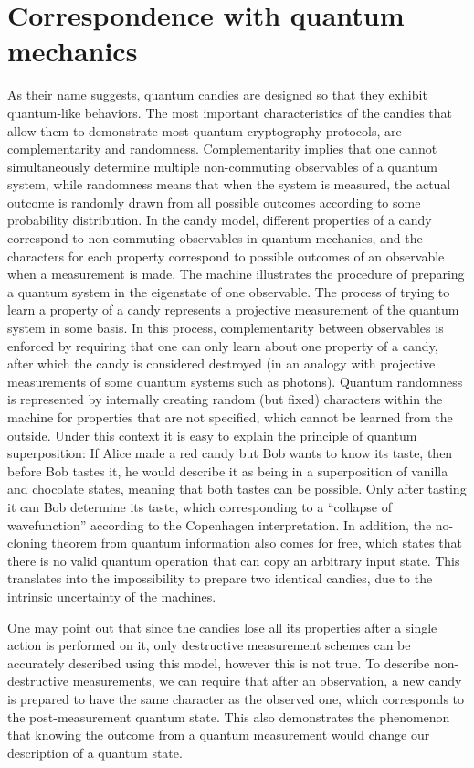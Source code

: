 \documentclass{article}
\begin{document}
\section{Correspondence with quantum mechanics}
As their name suggests, quantum candies are designed so that they exhibit quantum-like behaviors.
The most important characteristics of the candies that allow them to demonstrate most quantum cryptography protocols, are complementarity and randomness.
Complementarity implies that one cannot simultaneously determine multiple non-commuting observables of a quantum system, while randomness means that when the system is measured, the actual outcome is randomly drawn from all possible outcomes according to some probability distribution.
In the candy model, different properties of a candy correspond to non-commuting observables in quantum mechanics, and the characters for each property correspond to possible outcomes of an observable when a measurement is made.
The machine illustrates the procedure of preparing a quantum system in the eigenstate of one observable.
The process of trying to learn a property of a candy represents a projective measurement of the quantum system in some basis.
In this process, complementarity between observables is enforced by requiring that one can only learn about one property of a candy, after which the candy is considered destroyed (in an analogy with projective measurements of some quantum systems such as photons).
Quantum randomness is represented by internally creating random (but fixed) characters within the machine for properties that are not specified, which cannot be learned from the outside.
Under this context it is easy to explain the principle of quantum superposition: If Alice made a red candy but Bob wants to know its taste, then before Bob tastes it, he would describe it as being in a superposition of vanilla and chocolate states, meaning that both tastes can be possible.
Only after tasting it can Bob determine its taste, which corresponding to a ``collapse of wavefunction'' according to the Copenhagen interpretation.
In addition, the no-cloning theorem from quantum information also comes for free, which states that there is no valid quantum operation that can copy an arbitrary input state.
This translates into the impossibility to prepare two identical candies, due to the intrinsic uncertainty of the machines.

One may point out that since the candies lose all its properties after a single action is performed on it, only destructive measurement schemes can be accurately described using this model, however this is not true.
To describe non-destructive measurements, we can require that after an observation, a new candy is prepared to have the same character as the observed one, which corresponds to the post-measurement quantum state.
This also demonstrates the phenomenon that knowing the outcome from a quantum measurement would change our description of a quantum state.
\end{document}
